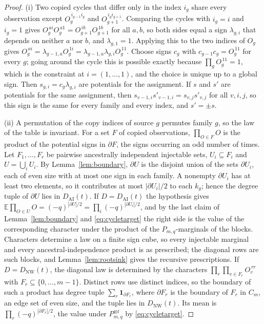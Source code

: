 \documentclass[11pt]{article}
\theoremstyle{plain}
\theoremstyle{definition}
\newcommand{\E}{\mathbb E}
\newcommand{\one}{\mathbf 1}
\begin{document}
\begin{proof}
(i) Two copied cycles that differ only in the index $i_g$ share every observation except $O_g^{\,i_{g-1}i_g}$ and $O_{g+1}^{\,i_gi_{g+1}}$. Comparing the cycles with $i_g=i$ and $i_g=1$ gives $O_g^{\,ai}O_g^{\,a1}=O_{g+1}^{\,ib}O_{g+1}^{\,1b}$ for all $a,b$, so both sides equal a sign $\lambda_{g,i}$ that depends on neither $a$ nor $b$, and $\lambda_{g,1}=1$. Applying this to the two indices of $O_g$ gives $O_g^{\,ai}=\lambda_{g-1,a}O_g^{\,1i}=\lambda_{g-1,a}\lambda_{g,i}O_g^{\,11}$. Choose signs $c_g$ with $c_{g-1}c_g=O_g^{\,11}$ for every $g$; going around the cycle this is possible exactly because $\prod_gO_g^{\,11}=1$, which is the constraint at $i=(1,\dots,1)$, and the choice is unique up to a global sign. Then $s_{g,i}=c_g\lambda_{g,i}$ are potentials for the assignment. If $s$ and $s'$ are potentials for the same assignment, then $s_{v-1,i}s'_{v-1,i}=s_{v,j}s'_{v,j}$ for all $v,i,j$, so this sign is the same for every family and every index, and $s'=\pm s$.

(ii) A permutation of the copy indices of source $g$ permutes family $g$, so the law of the table is invariant. For a set $F$ of copied observations, $\prod_{O\in F}O$ is the product of the potential signs in $\partial F$, the signs occurring an odd number of times. Let $F_1,\dots,F_r$ be pairwise ancestrally independent injectable sets, $U_i\subseteq F_i$ and $U=\bigcup_iU_i$. By Lemma~\ref{lem:boundary}, $\partial U$ is the disjoint union of the sets $\partial U_i$, each of even size with at most one sign in each family. A nonempty $\partial U_i$ has at least two elements, so it contributes at most $|\partial U_i|/2$ to each $k_g$; hence the degree tuple of $\partial U$ lies in $D_{\mathrm{AI}}(t)$. If $D=D_{\mathrm{AI}}(t)$ the hypothesis gives $\E\prod_{O\in U}O=(-q)^{|\partial U|/2}=\prod_i(-q)^{|\partial U_i|/2}$, and by the last claim of Lemma~\ref{lem:boundary} and \eqref{eq:cycletarget} the right side is the value of the corresponding character under the product of the $P_{m,q}$-marginals of the blocks. Characters determine a law on a finite sign cube, so every injectable marginal and every ancestral-independence product is as prescribed; the diagonal rows are such blocks, and Lemma~\ref{lem:rootsink} gives the recursive prescriptions. If $D=D_{\mathrm{NW}}(t)$, the diagonal law is determined by the characters $\prod_r\prod_{v\in F_r}O_v^{\,rr}$ with $F_r\subseteq\{0,\dots,m-1\}$. Distinct rows use distinct indices, so the boundary of such a product has degree tuple $\sum_r\one_{\partial F_r}$, where $\partial F_r$ is the boundary of $F_r$ in $C_m$, an edge set of even size, and the tuple lies in $D_{\mathrm{NW}}(t)$. Its mean is $\prod_r(-q)^{|\partial F_r|/2}$, the value under $P_{m,q}^{\otimes t}$ by \eqref{eq:cycletarget}.
\end{proof}
\end{document}

